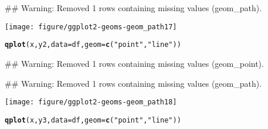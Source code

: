 \documentclass[a4paper,titlepage]{tufte-handout}\usepackage{graphicx, color}
\makeatletter
\def\maxwidth{ %
  \ifdim\Gin@nat@width>\linewidth
    \linewidth
  \else
    \Gin@nat@width
  \fi
}
\newcommand{\hlfunctioncall}[1]{\textcolor[rgb]{0.501960784313725,0,0.329411764705882}{\textbf{#1}}}%
\newcommand{\hlstring}[1]{\textcolor[rgb]{0.6,0.6,1}{#1}}%
\newenvironment{kframe}{%
 \def\at@end@of@kframe{}%
 \ifinner\ifhmode%
  \def\at@end@of@kframe{\end{minipage}}%
  \begin{minipage}{\columnwidth}%
 \fi\fi%
 \def\FrameCommand##1{\hskip\@totalleftmargin \hskip-\fboxsep
 \colorbox{shadecolor}{##1}\hskip-\fboxsep
     \hskip-\linewidth \hskip-\@totalleftmargin \hskip\columnwidth}%
 \MakeFramed {\advance\hsize-\width
   \@totalleftmargin\z@ \linewidth\hsize
   \@setminipage}}%
 {\par\unskip\endMakeFramed%
 \at@end@of@kframe}
\newenvironment{knitrout}{}{} %
\makeatother
\begin{document}
\begin{knitrout}
\begin{kframe}
{\ttfamily\noindent\textcolor{warningcolor}{\#\# Warning: Removed 1 rows containing missing values (geom\_path).}}\end{kframe}\texttt{[image: figure/ggplot2-geoms-geom\_path17]} \begin{kframe}\begin{alltt}
\hlfunctioncall{qplot}(x, y2, data = df, geom = \hlfunctioncall{c}(\hlstring{"point"},\hlstring{"line"}))
\end{alltt}


{\ttfamily\noindent\textcolor{warningcolor}{\#\# Warning: Removed 1 rows containing missing values (geom\_point).}}

{\ttfamily\noindent\textcolor{warningcolor}{\#\# Warning: Removed 1 rows containing missing values (geom\_path).}}\end{kframe}\texttt{[image: figure/ggplot2-geoms-geom\_path18]} \begin{kframe}\begin{alltt}
\hlfunctioncall{qplot}(x, y3, data = df, geom = \hlfunctioncall{c}(\hlstring{"point"},\hlstring{"line"}))
\end{alltt}



\end{kframe}
\end{knitrout}
\end{document}

